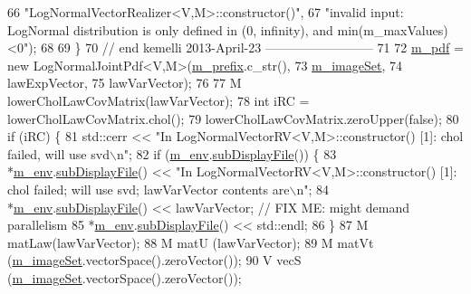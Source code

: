 \begin{DoxyCode}
66                       \textcolor{stringliteral}{"LogNormalVectorRealizer<V,M>::constructor()"},
67                       \textcolor{stringliteral}{"invalid input: LogNormal distribution is only defined in (0, infinity), and
       min(m\_maxValues)<0"});      
68               
69  \}      
70 \textcolor{comment}{// end kemelli 2013-April-23 --------------------------}
71 
72   \hyperlink{class_q_u_e_s_o_1_1_base_vector_r_v_a0ca926bca6fbcc688be6fc7496449e8e}{m\_pdf} = \textcolor{keyword}{new} LogNormalJointPdf<V,M>(\hyperlink{class_q_u_e_s_o_1_1_base_vector_r_v_a030ce3bc9873a9eaf6d8bf452c096ab3}{m\_prefix}.c\_str(),
73                                             \hyperlink{class_q_u_e_s_o_1_1_base_vector_r_v_ad31872bb4da22d47528cb9d691b3b7ff}{m\_imageSet},
74                                             lawExpVector,
75                                             lawVarVector);
76 
77   M lowerCholLawCovMatrix(lawVarVector);
78   \textcolor{keywordtype}{int} iRC = lowerCholLawCovMatrix.chol();
79   lowerCholLawCovMatrix.zeroUpper(\textcolor{keyword}{false});
80   \textcolor{keywordflow}{if} (iRC) \{
81     std::cerr << \textcolor{stringliteral}{"In LogNormalVectorRV<V,M>::constructor() [1]: chol failed, will use svd\(\backslash\)n"};
82     \textcolor{keywordflow}{if} (\hyperlink{class_q_u_e_s_o_1_1_base_vector_r_v_a556761c50e2d171977ef5f19a63c8c73}{m\_env}.\hyperlink{class_q_u_e_s_o_1_1_base_environment_a8a0064746ae8dddfece4229b9ad374d6}{subDisplayFile}()) \{
83       *\hyperlink{class_q_u_e_s_o_1_1_base_vector_r_v_a556761c50e2d171977ef5f19a63c8c73}{m\_env}.\hyperlink{class_q_u_e_s_o_1_1_base_environment_a8a0064746ae8dddfece4229b9ad374d6}{subDisplayFile}() << \textcolor{stringliteral}{"In LogNormalVectorRV<V,M>::constructor() [1]: chol
       failed; will use svd; lawVarVector contents are\(\backslash\)n"};
84       *\hyperlink{class_q_u_e_s_o_1_1_base_vector_r_v_a556761c50e2d171977ef5f19a63c8c73}{m\_env}.\hyperlink{class_q_u_e_s_o_1_1_base_environment_a8a0064746ae8dddfece4229b9ad374d6}{subDisplayFile}() << lawVarVector; \textcolor{comment}{// FIX ME: might demand parallelism}
85       *\hyperlink{class_q_u_e_s_o_1_1_base_vector_r_v_a556761c50e2d171977ef5f19a63c8c73}{m\_env}.\hyperlink{class_q_u_e_s_o_1_1_base_environment_a8a0064746ae8dddfece4229b9ad374d6}{subDisplayFile}() << std::endl;
86     \}
87     M matLaw(lawVarVector);
88     M matU  (lawVarVector);
89     M matVt (\hyperlink{class_q_u_e_s_o_1_1_base_vector_r_v_ad31872bb4da22d47528cb9d691b3b7ff}{m\_imageSet}.vectorSpace().zeroVector());
90     V vecS  (\hyperlink{class_q_u_e_s_o_1_1_base_vector_r_v_ad31872bb4da22d47528cb9d691b3b7ff}{m\_imageSet}.vectorSpace().zeroVector());

\end{DoxyCode}

